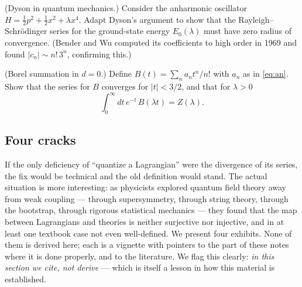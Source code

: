 \begin{exercise}[classic]
\label{exr:dyson-qm}
(Dyson in quantum mechanics.) Consider the anharmonic oscillator $H =
\frac{1}{2}p^2 + \frac{1}{2}x^2 + \lambda x^4$. Adapt Dyson's argument to show
that the Rayleigh--Schr\"odinger series for the ground-state energy
$E_0(\lambda)$ must have zero radius of convergence. (Bender and Wu computed its
coefficients to high order in 1969 and found $|c_n| \sim n!\,3^n$, confirming
this.)
\end{exercise}

\begin{exercise}[medium]
\label{exr:borel}
(Borel summation in $d=0$.) Define $B(t) = \sum_n a_n t^n/n!$ with $a_n$ as in
\eqref{eq:an}. Show that the series for $B$ converges for $|t| < 3/2$, and that
for $\lambda > 0$
\begin{equation*}
\int_0^\infty dt \, e^{-t}\, B(\lambda t) = Z(\lambda).
\end{equation*}
\end{exercise}

\subsection{Four cracks}
\label{sec:four-cracks}

If the only deficiency of ``quantize a Lagrangian'' were the divergence of its
series, the fix would be technical and the old definition would stand. The
actual situation is more interesting: as physicists explored quantum field
theory away from weak coupling --- through supersymmetry, through string theory,
through the bootstrap, through rigorous statistical mechanics --- they found
that the map between Lagrangians and theories is neither surjective nor
injective, and in at least one textbook case not even well-defined. We present
four exhibits. None of them is derived here; each is a vignette with pointers to
the part of these notes where it is done properly, and to the literature. We
flag this clearly: \emph{in this section we cite, not derive} --- which is
itself a lesson in how this material is established.


